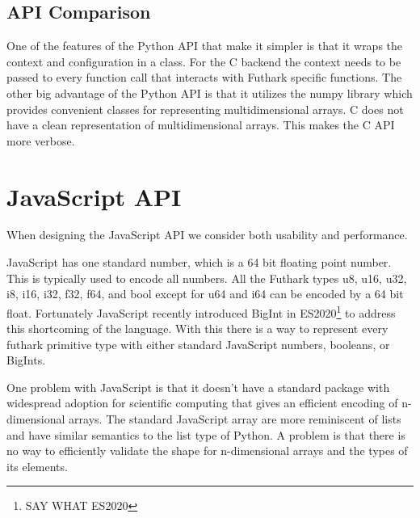 \documentclass[11pt]{book}
\begin{document}
\subsection{API Comparison}

One of the features of the Python API that make it simpler is that it wraps the context and configuration in a class. For the C backend the context needs to be passed to every function call that interacts with Futhark specific functions. The other big advantage of the Python API is that it utilizes the numpy library which provides convenient classes for representing multidimensional arrays. C does not have a clean representation of multidimensional arrays. This makes the C API more verbose.



\section{JavaScript API}

When designing the JavaScript API we consider both usability and performance. 


JavaScript has one standard number, which is a 64 bit floating point number. This is typically used to encode all numbers. All the Futhark types u8, u16, u32, i8, i16, i32, f32, f64, and bool except for u64 and i64 can be encoded by a 64 bit float. Fortunately JavaScript recently introduced BigInt in ES2020\footnote{SAY WHAT ES2020} to address this shortcoming of the language. With this there is a way to represent every futhark primitive type with either standard JavaScript numbers, booleans, or BigInts. 

One problem with JavaScript is that it doesn't have a standard package with widespread adoption for scientific computing that gives an efficient encoding of n-dimensional arrays. The standard JavaScript array are more reminiscent of lists and have similar semantics to the list type of Python. A problem is that there is no way to efficiently validate the shape for n-dimensional arrays and the types of its elements. 



\end{document}
